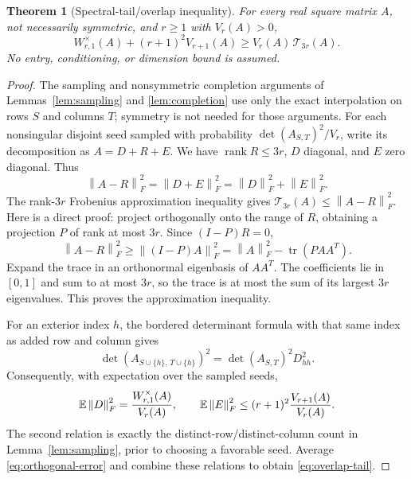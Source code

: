 \documentclass[11pt]{article}
\numberwithin{equation}{section}
\newtheorem{theorem}{Theorem}[section]
\theoremstyle{definition}\newtheorem{definition}[theorem]{Definition}
\theoremstyle{remark}\newtheorem{remark}[theorem]{Remark}
\newcommand{\1}{\mathbf 1}\newcommand{\diag}{\operatorname{diag}}
\newcommand{\rank}{\operatorname{rank}}\newcommand{\tr}{\operatorname{tr}}
\newcommand{\norm}[1]{\left\lVert#1\right\rVert}\newcommand{\abs}[1]{\left|#1\right|}
\begin{document}
\begin{theorem}[Spectral-tail/overlap inequality]\label{thm:overlap}
For every real square matrix $A$, not necessarily symmetric, and $r\ge1$ with $V_r(A)>0$,
\begin{equation}\label{eq:overlap-tail}
 W_{r,1}^{\times}(A)+(r+1)^2V_{r+1}(A)
 \ge V_r(A)\,\mathcal T_{3r}(A).
\end{equation}
No entry, conditioning, or dimension bound is assumed.
\end{theorem}
\begin{proof}
The sampling and nonsymmetric completion arguments of Lemmas~\ref{lem:sampling} and \ref{lem:completion} use only the exact interpolation on rows $S$ and columns $T$; symmetry is not needed for those arguments. For each nonsingular disjoint seed sampled with probability $\det(A_{S,T})^2/V_r$, write its decomposition as $A=D+R+E$. We have $\rank R\le3r$, $D$ diagonal, and $E$ zero diagonal. Thus
\begin{equation}\label{eq:orthogonal-error}
 \norm{A-R}_F^2=\norm{D+E}_F^2=\norm D_F^2+\norm E_F^2.
\end{equation}
The rank-$3r$ Frobenius approximation inequality gives $\mathcal T_{3r}(A)\le\norm{A-R}_F^2$. Here is a direct proof: project orthogonally onto the range of $R$, obtaining a projection $P$ of rank at most $3r$. Since $(I-P)R=0$,
\[
 \norm{A-R}_F^2\ge\norm{(I-P)A}_F^2
 =\norm A_F^2-\tr(PAA^T).
\]
Expand the trace in an orthonormal eigenbasis of $AA^T$. The coefficients lie in $[0,1]$ and sum to at most $3r$, so the trace is at most the sum of its largest $3r$ eigenvalues. This proves the approximation inequality.

For an exterior index $h$, the bordered determinant formula with that same index as added row and column gives
\[
 \det(A_{S\cup\{h\},\,T\cup\{h\}})^2
 =\det(A_{S,T})^2D_{hh}^2.
\]
Consequently, with expectation over the sampled seeds,
\[
 \E\norm D_F^2=\frac{W_{r,1}^{\times}(A)}{V_r(A)},\qquad
 \E\norm E_F^2\le(r+1)^2\frac{V_{r+1}(A)}{V_r(A)}.
\]
The second relation is exactly the distinct-row/distinct-column count in Lemma~\ref{lem:sampling}, prior to choosing a favorable seed. Average \eqref{eq:orthogonal-error} and combine these relations to obtain \eqref{eq:overlap-tail}.
\end{proof}
\end{document}
